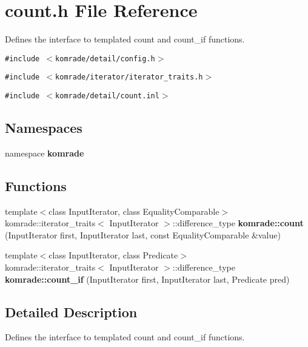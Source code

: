 \section{count.h File Reference}
\label{count_8h}
Defines the interface to templated count and count\_\-if functions. 

{\tt \#include $<$komrade/detail/config.h$>$}\par
{\tt \#include $<$komrade/iterator/iterator\_\-traits.h$>$}\par
{\tt \#include $<$komrade/detail/count.inl$>$}\par
\subsection*{Namespaces}
\begin{CompactItemize}
\item 
namespace {\bf komrade}
\end{CompactItemize}
\subsection*{Functions}
\begin{CompactItemize}
\item 
{\footnotesize template$<$class InputIterator, class EqualityComparable$>$ }\\komrade::iterator\_\-traits$<$ InputIterator $>$::difference\_\-type {\bf komrade::count} (InputIterator first, InputIterator last, const EqualityComparable \&value)
\item 
{\footnotesize template$<$class InputIterator, class Predicate$>$ }\\komrade::iterator\_\-traits$<$ InputIterator $>$::difference\_\-type {\bf komrade::count\_\-if} (InputIterator first, InputIterator last, Predicate pred)
\end{CompactItemize}


\subsection{Detailed Description}
Defines the interface to templated count and count\_\-if functions. 

